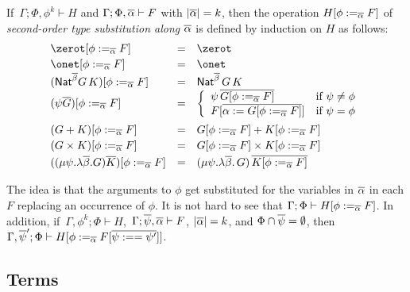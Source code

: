 \documentclass{lmcs}
\theoremstyle{plain}\newtheorem{satz}[thm]{Satz}
\begin{document}
\begin{defi}\label{def:second-order-subst}
If \,$\Gamma; \Phi,\phi^k \vdash H$ and $\Gamma;\Phi, \overline{\alpha}
\vdash F$ with $|\overline{\alpha}| = k$, then the operation $H[\phi :=_{\overline{\alpha}} F]$ of {\em second-order type substitution along
  $\overline{\alpha}$} is defined by induction on $H$ as follows:
\[\begin{array}{lll}
\zerot[\phi :=_{\ol{\alpha}} F] & = & \zerot\\[0.5ex]
\onet[\phi :=_{\ol{\alpha}} F] & = & \onet\\[0.25ex]
(\Nat^{\ol\beta} G \,K)[\phi :=_{\ol{\alpha}} F]
& = & \Nat^{\ol\beta}\, G \,K\\
(\psi\ol{G})[\phi :=_{\ol{\alpha}} F] & = &
\left\{\begin{array}{ll}
\psi \,\ol{G[\phi :=_{\ol{\alpha}} F]} & \mbox{if } \psi \not = \phi\\
  F[\ol{\alpha  := G[\phi :=_{\ol{\alpha}} F]}] 
  & \mbox{if } \psi = \phi
\end{array}\right.\\[2.8ex]
(G + K)[\phi :=_{\ol{\alpha}} F] & = & G[\phi
  :=_{\ol{\alpha}} F] + K[\phi :=_{\ol{\alpha}} F]\\[0.5ex] 
(G \times K)[\phi :=_{\ol{\alpha}} F] & = &
G[\phi :=_{\ol{\alpha}} F] \times K[\phi
  :=_{\ol{\alpha}} F]\\[0.5ex]   
((\mu \psi. \lambda \ol{\beta}. G)\ol{K})[\phi :=_{\ol{\alpha}}
  F] & = & (\mu \psi. \lambda \ol{\beta}. \,G)\, \ol{K[\phi :=_{\ol{\alpha}} F]}
\end{array}\]
\end{defi}
\noindent
The idea is that the arguments to $\phi$ get substituted for the
variables in $\overline{\alpha}$ in each $F$ replacing an occurrence of
$\phi$. It is not hard to see that $\Gamma;\Phi \vdash H[\phi
  :=_{\overline{\alpha}} F]$. In addition, if \,$\Gamma, \phi^k; \Phi \vdash
H$,\, $\Gamma; \overline{\psi},\overline{\alpha} \vdash F$, $|\overline{\alpha}| = k$, and
$\Phi \cap \overline{\psi} = \emptyset$, then $\Gamma,\overline{\psi}';\Phi \vdash
H[\phi :=_{\overline{\alpha}} F[\overline{\psi :== \psi'}]]$.

\subsection{Terms}\label{sec:terms}
\end{document}
